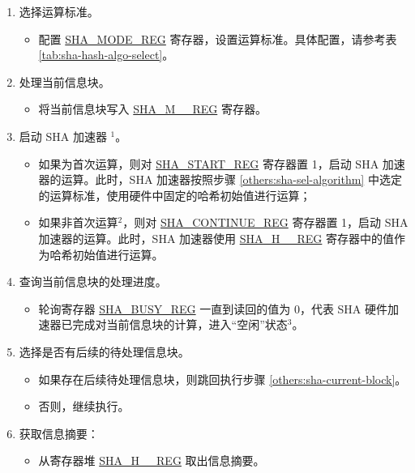 \begin{enumerate}
    \item \label{others:sha-sel-algorithm} 选择运算标准。
    \begin{itemize}
        \item 配置 \hyperref[regdesc:SHAMODEREG]{SHA\_MODE\_REG} 寄存器，设置运算标准。具体配置，请参考表 \ref{tab:sha-hash-algo-select}。
    \end{itemize}
    \item \label{others:sha-current-block} 处理当前信息块。
    \begin{itemize}
        \item 将当前信息块写入 \hyperref[regdesc:SHAMNREG]{SHA\_M\_\_REG} 寄存器。
    \end{itemize}
    \item 启动 SHA 加速器 \hyperref[others:sha-note-typical-sha]{$^1$}。
            \begin{itemize}
                \item 如果为首次运算，则对 \hyperref[regdesc:SHASTARTREG]{SHA\_START\_REG} 寄存器置 1，启动 SHA 加速器的运算。此时，SHA 加速器按照步骤 \ref{others:sha-sel-algorithm} 中选定的运算标准，使用硬件中固定的哈希初始值进行运算；
                \item 如果非首次运算\hyperref[others:sha-note-typical-sha]{$^2$}，则对 \hyperref[regdesc:SHACONTINUEREG]{SHA\_CONTINUE\_REG} 寄存器置 1，启动 SHA 加速器的运算。此时，SHA 加速器使用 \hyperref[regdesc:SHAHNREG]{SHA\_H\_\_REG} 寄存器中的值作为哈希初始值进行运算。
            \end{itemize}
    \item 查询当前信息块的处理进度。
    \begin{itemize}
        \item 轮询寄存器 \hyperref[regdesc:SHABUSYREG]{SHA\_BUSY\_REG} 一直到读回的值为 0，代表 SHA 硬件加速器已完成对当前信息块的计算，进入“空闲”状态\hyperref[others:sha-note-typical-sha]{$^3$}。
    \end{itemize}
        
    \item 选择是否有后续的待处理信息块。
    \begin{itemize}
        \item 如果存在后续待处理信息块，则跳回执行步骤 \ref{others:sha-current-block}。
        \item 否则，继续执行。
    \end{itemize}
    \item 获取信息摘要：
    \begin{itemize}
        \item 从寄存器堆 \hyperref[regdesc:SHAHNREG]{SHA\_H\_\_REG} 取出信息摘要。
    \end{itemize}
\end{enumerate}